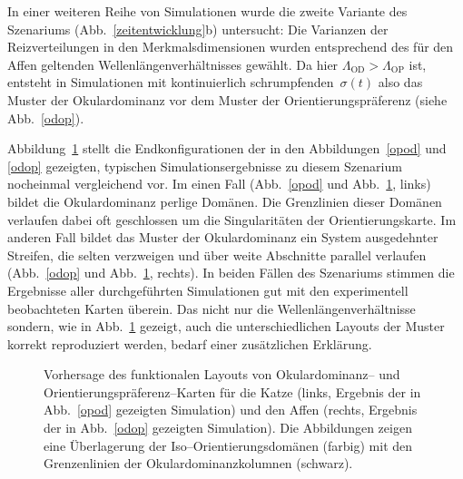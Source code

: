 In einer weiteren Reihe von Simulationen wurde die zweite Variante des
Szenariums (Abb.~\ref{zeitentwicklung}b) untersucht: Die Varianzen der
Reizverteilungen in den Merkmalsdimensionen wurden entsprechend des für
den Affen geltenden Wellen\-längen\-ver\-hältnisses gewählt. Da hier
$\Lambda_{\text{OD}} > \Lambda_{\text{OP}}$ ist, entsteht in Simulationen
mit kontinuierlich schrumpfenden~$\sigma(t)$ also das Muster der
Okulardominanz vor dem Muster der Orientierungspräferenz (siehe
Abb.~\ref{odop}).

Abbildung~\ref{simres} stellt die Endkonfigurationen der in den
Abbildungen~\ref{opod} und \ref{odop} gezeigten, typischen
Simulationsergebnisse zu diesem Szenarium nocheinmal vergleichend vor.  Im
einen Fall (Abb.~\ref{opod} und Abb.~\ref{simres}, links) bildet die
Okulardominanz perlige Domänen. Die Grenzlinien dieser Domänen verlaufen
dabei oft geschlossen um die Singularitäten der Orientierungskarte.  Im
anderen Fall bildet das Muster der Okulardominanz ein System ausgedehnter
Streifen, die selten verzweigen und über weite Abschnitte parallel
verlaufen (Abb.~\ref{odop} und Abb.~\ref{simres}, rechts).
In beiden Fällen des Szenariums stimmen die Ergebnisse aller durchgeführten
Simulationen gut mit den experimentell beobachteten Karten überein. Das
nicht nur die Wellenlängenverhältnisse sondern, wie in Abb.~\ref{simres}
gezeigt, auch die unterschiedlichen Layouts der Muster korrekt reproduziert
werden, bedarf einer zusätzlichen Erklärung.

\begin{figure}[t]
\centering
\begin{minipage}[t]{6.2cm}
\end{minipage}
\hskip0.4cm
\begin{minipage}[t]{6.2cm}
\end{minipage}
\caption{Vorhersage des funktionalen Layouts von Okulardominanz-- und
Orientierungspräferenz--Karten für die Katze (links, Ergebnis der in
Abb.~\ref{opod} gezeigten Simulation) und den Affen (rechts, Ergebnis der
in Abb.~\ref{odop} gezeigten Simulation).  Die Abbildungen zeigen eine
Überlagerung der Iso--Orientierungsdomänen (farbig) mit den Grenzenlinien
der Okulardominanzkolumnen (schwarz).}
\label{simres}
\end{figure}

